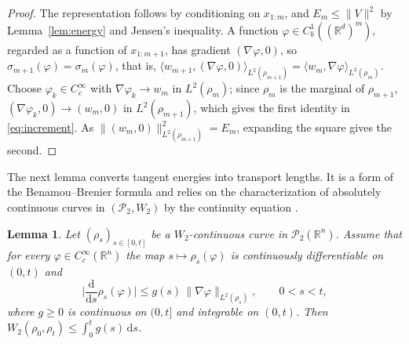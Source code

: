 \documentclass[11pt]{amsart}
\numberwithin{equation}{section}
\theoremstyle{plain}
\newtheorem{lemma}[theorem]{Lemma}
\theoremstyle{remark}
\newcommand{\R}{\mathbb{R}}
\newcommand{\cP}{\mathcal{P}}
\newcommand{\W}{W_2}
\newcommand{\dd}{\mathrm{d}}
\newcommand{\la}{\langle}
\newcommand{\ra}{\rangle}
\begin{document}
\begin{proof}
The representation follows by conditioning on $x_{1:m}$, and $E_m\le\|V\|^2$ by Lemma~\ref{lem:energy} and Jensen's inequality. A function $\varphi\in C^1_b((\R^d)^m)$, regarded as a function of $x_{1:m+1}$, has gradient $(\nabla\varphi,0)$, so $\sigma_{m+1}(\varphi)=\sigma_m(\varphi)$, that is, $\la w_{m+1},(\nabla\varphi,0)\ra_{L^2(\rho_{m+1})}=\la w_m,\nabla\varphi\ra_{L^2(\rho_m)}$. Choose $\varphi_k\in C^\infty_c$ with $\nabla\varphi_k\to w_m$ in $L^2(\rho_m)$; since $\rho_m$ is the marginal of $\rho_{m+1}$, $(\nabla\varphi_k,0)\to(w_m,0)$ in $L^2(\rho_{m+1})$, which gives the first identity in \eqref{eq:increment}. As $\|(w_m,0)\|^2_{L^2(\rho_{m+1})}=E_m$, expanding the square gives the second.
\end{proof}

The next lemma converts tangent energies into transport lengths. It is a form of the Benamou--Brenier formula \cite{BB00} and relies on the characterization of absolutely continuous curves in $(\cP_2,\W)$ by the continuity equation \cite[Theorem~8.3.1]{AGS08}.

\begin{lemma}\label{lem:length}
Let $(\rho_s)_{s\in[0,t]}$ be a $\W$-continuous curve in $\cP_2(\R^n)$. Assume that for every $\varphi\in C^\infty_c(\R^n)$ the map $s\mapsto\rho_s(\varphi)$ is continuously differentiable on $(0,t)$ and
\begin{equation}\label{eq:speed-hyp}
\Big|\frac{\dd}{\dd s}\rho_s(\varphi)\Big|\le g(s)\,\|\nabla\varphi\|_{L^2(\rho_s)},\qquad 0<s<t,
\end{equation}
where $g\ge0$ is continuous on $(0,t]$ and integrable on $(0,t)$. Then $\W(\rho_0,\rho_t)\le\int_0^tg(s)\,\dd s$.
\end{lemma}
\end{document}
